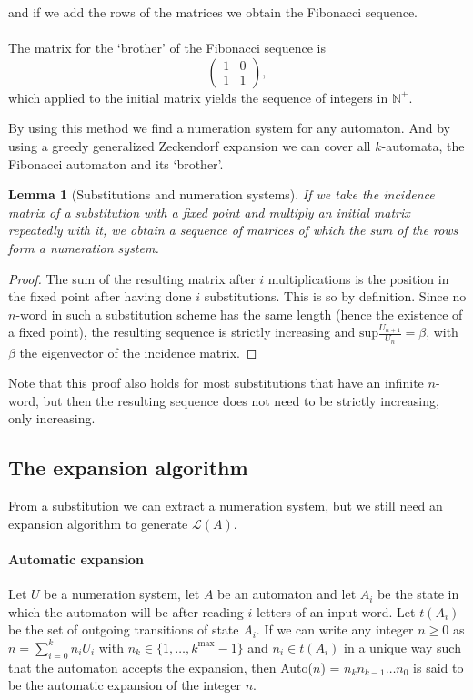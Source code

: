 \documentclass{article}
\newtheorem{lemma}[theorem]{Lemma}
\theoremstyle{definition}
\begin{document}
and if we add the rows of the matrices we obtain the Fibonacci sequence.\\
\\
The matrix for the `brother' of the Fibonacci sequence is
\begin{displaymath} \left( \begin{array}{cc}
1 & 0\\
1 & 1
\end{array} \right), \end{displaymath}
which applied to the initial matrix yields the sequence of integers in 
$\mathbb{N}^+$.

By using this method we find a numeration system for any automaton. And by 
using a greedy generalized Zeckendorf expansion we can cover all $k$-automata, 
the Fibonacci automaton and its `brother'.

\begin{lemma}[Substitutions and numeration systems] \label{lem:subst-numsys}
If we take the incidence matrix of a substitution with a fixed point and
multiply an initial matrix repeatedly with it, we obtain a sequence of matrices
of which the sum of the rows form a numeration system.
\end{lemma}

\begin{proof}
The sum of the resulting matrix after $i$ multiplications is the position in 
the fixed point after having done $i$ substitutions. This is so by definition.
Since no $n$-word in such a substitution scheme has the same length (hence the
existence of a fixed point), the resulting sequence is strictly increasing and
$\mathrm{sup}\frac{U_{n + 1}}{U_n} = \beta$, with $\beta$ the eigenvector of
the incidence matrix.
\end{proof}

Note that this proof also holds for most substitutions that have an infinite
$n$-word, but then the resulting sequence does not need to be strictly 
increasing, only increasing.

\subsection{The expansion algorithm}
From a substitution we can extract a numeration system, but we still need an
expansion algorithm to generate $\mathcal{L}(A)$. 

\paragraph{Automatic expansion}
Let $U$ be a numeration system, let $A$ be an automaton and let $A_i$ be 
the state in which the automaton will be after reading $i$ letters of an 
input word. Let $t(A_i)$ be the set of outgoing transitions of state $A_i$.
If we can write any integer $n \ge 0$ as 
$n = \sum_{i = 0}^k n_i U_i$ with 
$n_k \in \{1, \ldots, k^\mathrm{max} - 1\}$ and $n_i \in t(A_i)$ in a 
unique way such that the automaton accepts the expansion, then Auto($n$) = 
$n_k n_{k - 1} \ldots n_0$ is said to be the automatic expansion of the 
integer $n$.
\end{document}
